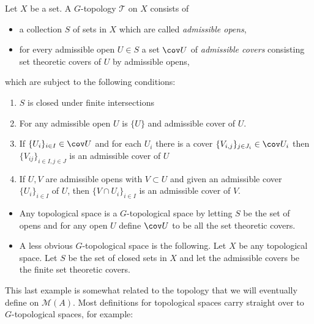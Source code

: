 \begin{definition}
	[$G$-topology]
	Let $X$ be a set. 
	A $G$-topology $\mathcal{T} $ on $X $ consists of 
	\begin{itemize}
		\item  a collection $S$ of sets in $X$ which are called \emph{admissible opens},
		\item for every admissible open $U \in S$ a set $\cov U$ of \emph{admissible covers} consisting set theoretic covers of $U$ by admissible opens,
	\end{itemize}
	which are subject to the following conditions:
	\begin{enumerate}
		\item $S$ is closed under finite intersections
		\item For any admissible open $U$ is $\{U\}$ and admissible cover of $U$.
		\item If $\{U_i\}_{i \in I} \in \cov U $ and for each $U_i$ there is a cover $\{V_{i, j}\}_{j \in J_i} \in \cov U_i$ then $\{V_{ij}\} _{i \in I, j \in J}$ is an admissible cover of $U$
		\item If  $U, V$ are admissible opens with $V \subset  U$ and given an admissible cover $\{U_i\}_{i \in I} $ of $U$, then $\{V \cap U_i\} _{i \in I}$ is an admissible cover of $V$. 
	\end{enumerate}
\end{definition}
\begin{example}
	\begin{itemize}
		\item Any topological space is a $G$-topological space by letting $S$ be the set of opens and for any open  $U$ define $\cov U$ to be all the set theoretic covers. 
		\item A less obvious $G$-topological space is the following. 
			Let $X$ be any topological space. 
			Let $S$ be the set of closed sets in $X$ and let the admissible covers be the finite set theoretic covers. 
	\end{itemize}
\end{example}
This last example is somewhat related to the topology that we will eventually define on $\mathcal{M} (A)$. 
Most definitions for topological spaces carry straight over to $G$-topological spaces, for example: 
